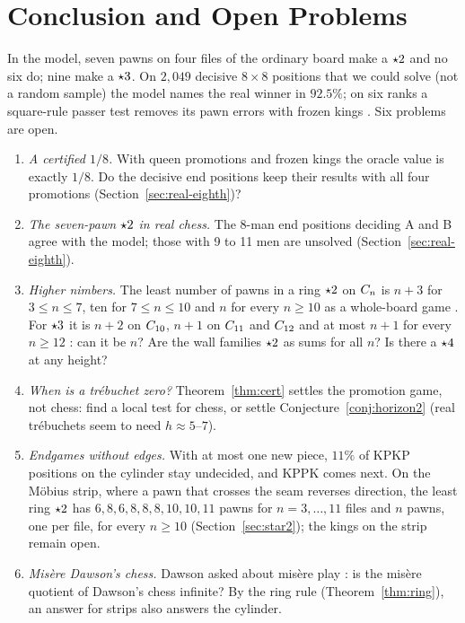 \section{Conclusion and Open Problems}\label{sec:conclusion}

In the model, seven pawns on four files of the ordinary board make a $\mathord{\star2}$ and no six do; nine make a
$\mathord{\star3}$. On $2{,}049$ decisive $8\times8$ positions that we could solve (not a random sample) the model names the real winner in $92.5\%$; on six ranks a
square-rule passer test removes its pawn errors with frozen kings . Six problems are open.

\begin{enumerate}
\item \emph{A certified $1/8$.} With queen promotions and frozen kings the oracle value is exactly $1/8$. Do
  the decisive end positions keep their results with all four promotions (Section~\ref{sec:real-eighth})?
\item \emph{The seven-pawn $\mathord{\star2}$ in real chess.} The 8-man end positions deciding A and B agree with the
  model; those with 9 to 11 men are unsolved
  (Section~\ref{sec:real-eighth}).
\item \emph{Higher nimbers.} The least number of pawns in a ring $\mathord{\star2}$ on $C_{n}$ is $n+3$ for $3\le n\le7$,
  ten for $7\le n\le10$  and $n$ for every $n\ge10$ as a whole-board game . For $\mathord{\star3}$ it is $n+2$ on $C_{10}$, $n+1$ on $C_{11}$ and $C_{12}$  and at
  most $n+1$ for every $n\ge12$ : can it be $n$? Are the wall
  families $\mathord{\star2}$ as sums for all $n$? Is there a $\mathord{\star4}$ at any height?
\item \emph{When is a tr\'ebuchet zero?} Theorem~\ref{thm:cert} settles the promotion game, not chess: find a
  local test for chess, or settle Conjecture~\ref{conj:horizon2} (real tr\'ebuchets seem to need $h\approx5$--$7$).
\item \emph{Endgames without edges.} With at most one new piece, $11\%$ of KPKP positions on the cylinder
  stay undecided, and KPPK comes next. On the M\"obius strip, where a pawn that crosses
  the seam reverses direction, the least ring $\mathord{\star2}$ has $6, 8, 6, 8, 8, 8, 10, 10, 11$ pawns for $n=3,\dots,11$
  files  and $n$ pawns, one per file, for every $n\ge10$  (Section~\ref{sec:star2}); the kings on the
  strip remain open.
\item \emph{Mis\`ere Dawson's chess.} Dawson asked about mis\`ere play \cite{Dawson1935}: is the mis\`ere
  quotient \cite{PlambeckSiegel2008} of Dawson's chess infinite? By the ring rule (Theorem~\ref{thm:ring}), an
  answer for strips also answers the cylinder.
\end{enumerate}
